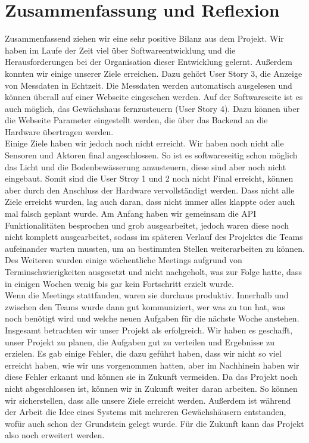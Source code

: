 \section{Zusammenfassung und Reflexion}
Zusammenfassend ziehen wir eine sehr positive Bilanz aus dem Projekt. Wir haben im Laufe der Zeit viel über Softwareentwicklung und die Herausforderungen bei der Organisation dieser Entwicklung gelernt. Außerdem konnten wir einige unserer Ziele erreichen. Dazu gehört User Story 3, die Anzeige von Messdaten in Echtzeit. Die Messdaten werden automatisch ausgelesen und können überall auf einer Webseite eingesehen werden. Auf der Softwareseite ist es auch möglich, das Gewächshaus fernzusteuern (User Story 4). Dazu können über die Webseite Parameter eingestellt werden, die über das Backend an die Hardware übertragen werden. \\
Einige Ziele haben wir jedoch noch nicht erreicht. Wir haben noch nicht alle Sensoren und Aktoren final angeschlossen. So ist es softwareseitig schon möglich das Licht und die Bodenbewässerung anzusteuern, diese sind aber noch nicht eingebaut. Somit sind die User Stroy 1 und 2 noch nicht Final erreicht, können aber durch den Anschluss der Hardware vervollständigt werden. Dass nicht alle Ziele erreicht wurden, lag auch daran, dass nicht immer alles klappte oder auch mal falsch geplant wurde. Am Anfang haben wir gemeinsam die API Funktionalitäten besprochen und grob ausgearbeitet, jedoch waren diese noch nicht komplett ausgearbeitet, sodass im späteren Verlauf des Projektes die Teams aufeinander warten mussten, um an bestimmten Stellen weiterarbeiten zu können. Des Weiteren wurden einige wöchentliche Meetings aufgrund von Terminschwierigkeiten ausgesetzt und nicht nachgeholt, was zur Folge hatte, dass in einigen Wochen wenig bis gar kein Fortschritt erzielt wurde.\\
Wenn die Meetings stattfanden, waren sie durchaus produktiv. Innerhalb und zwischen den Teams wurde dann gut kommuniziert, wer was zu tun hat, was noch benötigt wird und welche neuen Aufgaben für die nächste Woche anstehen.  \\
Insgesamt betrachten wir unser Projekt als erfolgreich. Wir haben es geschafft, unser Projekt zu planen, die Aufgaben gut zu verteilen und Ergebnisse zu erzielen. Es gab einige Fehler, die dazu geführt haben, dass wir nicht so viel erreicht haben, wie wir uns vorgenommen hatten, aber im Nachhinein haben wir diese Fehler erkannt und können sie in Zukunft vermeiden. Da das Projekt noch nicht abgeschlossen ist, können wir in Zukunft weiter daran arbeiten. So können wir sicherstellen, dass alle unsere Ziele erreicht werden. Außerdem ist während der Arbeit die Idee eines Systems mit mehreren Gewächshäusern entstanden, wofür auch schon der Grundstein gelegt wurde. Für die Zukunft kann das Projekt also noch erweitert werden.





\pagebreak
